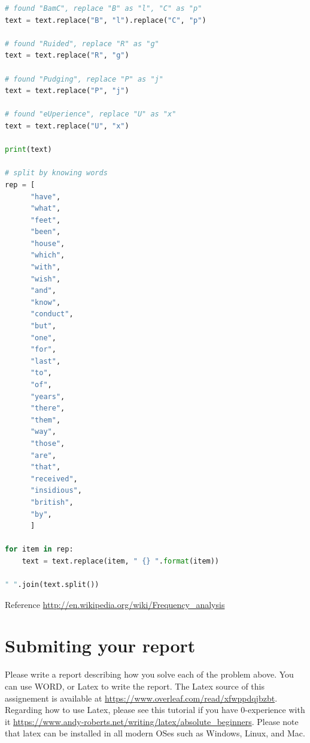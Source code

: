 \documentclass[11pt]{article}
\begin{document}
\begin{lstlisting}[language=Python]
# found "BamC", replace "B" as "l", "C" as "p"
text = text.replace("B", "l").replace("C", "p")

# found "Ruided", replace "R" as "g"
text = text.replace("R", "g")

# found "Pudging", replace "P" as "j"
text = text.replace("P", "j")

# found "eUperience", replace "U" as "x"
text = text.replace("U", "x")

print(text)

# split by knowing words
rep = [
      "have",
      "what",
      "feet",
      "been",
      "house",
      "which",
      "with",
      "wish",
      "and",
      "know",
      "conduct",
      "but",
      "one",
      "for",
      "last",
      "to",
      "of",
      "years",
      "there",
      "them",
      "way",
      "those",
      "are",
      "that",
      "received",
      "insidious",
      "british",
      "by",
      ]

for item in rep:
    text = text.replace(item, " {} ".format(item))

" ".join(text.split())
\end{lstlisting}

\vspace{0.5in}
Reference \url{http://en.wikipedia.org/wiki/Frequency_analysis}
\vspace{0.5in}


\section{Submiting your report}
Please write a report describing how you solve each of the problem above. You can use WORD, or Latex to write the report. The Latex source of this assignement is available at \url{https://www.overleaf.com/read/xfwppdqjbzbt}. Regarding how to use Latex, please see this tutorial if you have 0-experience with it \url{https://www.andy-roberts.net/writing/latex/absolute_beginners}. Please note that latex can be installed in all modern OSes such as Windows, Linux, and Mac.
\end{document}
